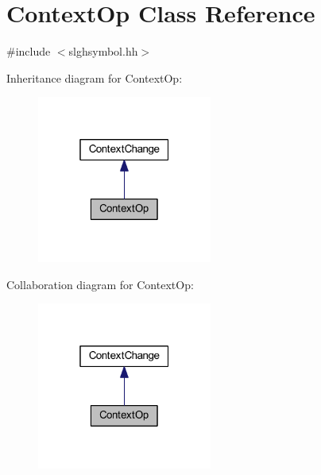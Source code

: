 \hypertarget{class_context_op}{}\section{Context\+Op Class Reference}
\label{class_context_op}


{\ttfamily \#include $<$slghsymbol.\+hh$>$}



Inheritance diagram for Context\+Op\+:
\nopagebreak
\begin{figure}[H]
\begin{center}
\leavevmode
\includegraphics[width=163pt]{class_context_op__inherit__graph}
\end{center}
\end{figure}


Collaboration diagram for Context\+Op\+:
\nopagebreak
\begin{figure}[H]
\begin{center}
\leavevmode
\includegraphics[width=163pt]{class_context_op__coll__graph}
\end{center}
\end{figure}
